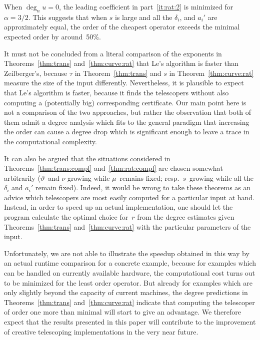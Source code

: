 \documentclass{sig-alternate}
\def\deg{\operatorname{deg}}
\begin{document}
When $\deg_nu=0$, the leading coefficient in part~\ref{it:rat:2} is minimized
for $\alpha=3/2$. This suggests that when $s$ is large and all the $\delta_i$,
and $a_i'$ are approximately equal, the order of the cheapest operator
exceeds the minimal expected order by around~50\%.

It must not be concluded from a literal comparison of the exponents in
Theorems~\ref{thm:trans} and~\ref{thm:curve:rat} that Le's algorithm is faster
than Zeilberger's, because $\tau$ in Theorem~\ref{thm:trans} and $s$ in
Theorem~\ref{thm:curve:rat} measure the size of the input differently. Nevertheless,
it is plausible to expect that Le's algorithm is faster, because it finds
the telescopers without also computing a (potentially big) corresponding
certificate. Our main point here is not a comparison of the two approaches, but
rather the observation that both of them admit a degree analysis which fits to the
general paradigm that increasing the order can cause a degree drop which is
significant enough to leave a trace in the computational complexity.

It can also be argued that the situations considered in
Theorems~\ref{thm:trans:compl} and~\ref{thm:rat:compl} are chosen somewhat
arbitrarily ($\vartheta$~and $\nu$ growing while $\mu$~remains fixed; resp.\
$s$~growing while all the $\delta_i$ and $a_i'$ remain fixed). Indeed, it would
be wrong to take these theorems as an advice which telescopers are most easily
computed for a particular input at hand. Instead, in order to speed up an actual
implementation, one should let the program calculate the optimal choice for~$r$
from the degree estimates given Theorems~\ref{thm:trans} and~\ref{thm:curve:rat}
with the particular parameters of the input.

Unfortunately, we are not able to illustrate the speedup obtained in this way by
an actual runtime comparison for a concrete example, because for examples which
can be handled on currently available hardware, the computational cost turns out
to be minimized for the least order operator. But already for examples which are
only slightly beyond the capacity of current machines, the degree predictions in
Theorems~\ref{thm:trans} and~\ref{thm:curve:rat} indicate that computing the
telescoper of order one more than minimal will start to give an advantage. We
therefore expect that the results presented in this paper will contribute to the
improvement of creative telescoping implementations in the very near future.
\end{document}
